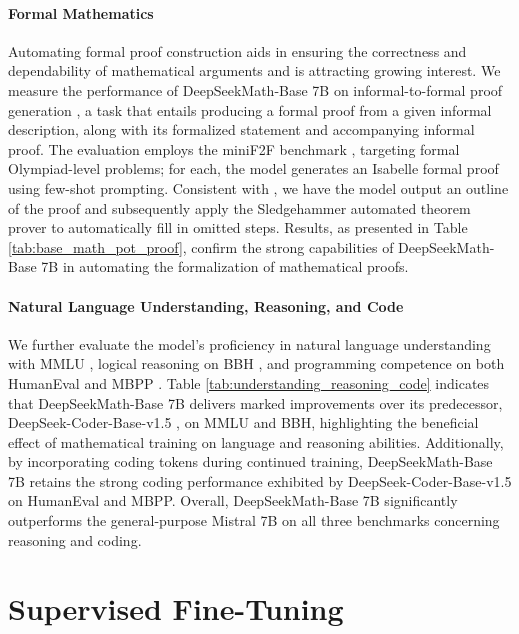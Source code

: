 \paragraph{Formal Mathematics}

Automating formal proof construction aids in ensuring the correctness and dependability of mathematical arguments and is attracting growing interest. We measure the performance of DeepSeekMath-Base 7B on informal-to-formal proof generation \citep{dsp_proof}, a task that entails producing a formal proof from a given informal description, along with its formalized statement and accompanying informal proof. The evaluation employs the miniF2F benchmark \citep{minif2f}, targeting formal Olympiad-level problems; for each, the model generates an Isabelle formal proof using few-shot prompting. Consistent with \cite{dsp_proof}, we have the model output an outline of the proof and subsequently apply the Sledgehammer automated theorem prover \citep{sledgehammer} to automatically fill in omitted steps. Results, as presented in Table \ref{tab:base_math_pot_proof}, confirm the strong capabilities of DeepSeekMath-Base 7B in automating the formalization of mathematical proofs.

\paragraph{Natural Language Understanding, Reasoning, and Code}

We further evaluate the model's proficiency in natural language understanding with MMLU \citep{mmlu}, logical reasoning on BBH \citep{bbh}, and programming competence on both HumanEval \citep{codex} and MBPP \citep{mbpp}. Table \ref{tab:understanding_reasoning_code} indicates that DeepSeekMath-Base 7B delivers marked improvements over its predecessor, DeepSeek-Coder-Base-v1.5 \citep{deepseek-coder}, on MMLU and BBH, highlighting the beneficial effect of mathematical training on language and reasoning abilities. Additionally, by incorporating coding tokens during continued training, DeepSeekMath-Base 7B retains the strong coding performance exhibited by DeepSeek-Coder-Base-v1.5 on HumanEval and MBPP. Overall, DeepSeekMath-Base 7B significantly outperforms the general-purpose Mistral 7B \citep{mistral} on all three benchmarks concerning reasoning and coding.

\section{Supervised Fine-Tuning}

